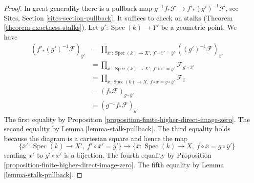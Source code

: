 \documentclass[10pt,a4paper]{amsart}
\theoremstyle{plain}
\theoremstyle{definition}
\theoremstyle{remark}
\numberwithin{equation}{subsection}
\def\Spec{\mathop{\mathrm{Spec}}}
\begin{document}
\begin{proof}
In great generality there is a pullback map
$g^{-1}f_*\mathcal{F} \to f'_*(g')^{-1}\mathcal{F}$, see
Sites, Section \ref{sites-section-pullback}.
It suffices to check on stalks (Theorem \ref{theorem-exactness-stalks}).
Let $\overline{y}' : \Spec(k) \to Y'$ be a geometric point.
We have
\begin{align*}
(f'_*(g')^{-1}\mathcal{F})_{\overline{y}'}
& =
\prod\nolimits_{\overline{x}' : \Spec(k) \to X',\ f' \circ \overline{x}' =
\overline{y}'}
((g')^{-1}\mathcal{F})_{\overline{x}'} \\
& =
\prod\nolimits_{\overline{x}' : \Spec(k) \to X',\ f' \circ \overline{x}' =
\overline{y}'} \mathcal{F}_{g' \circ \overline{x}'} \\
& =
\prod\nolimits_{\overline{x} : \Spec(k) \to X,\ f \circ \overline{x} =
g \circ \overline{y}'} \mathcal{F}_{\overline{x}} \\
& =
(f_*\mathcal{F})_{g \circ \overline{y}'} \\
& =
(g^{-1}f_*\mathcal{F})_{\overline{y}'}
\end{align*}
The first equality by
Proposition \ref{proposition-finite-higher-direct-image-zero}.
The second equality by
Lemma \ref{lemma-stalk-pullback}.
The third equality holds because the diagram is a cartesian square
and hence the map
$$
\{\overline{x}' : \Spec(k) \to X',\ f' \circ \overline{x}' =
\overline{y}'\}
\longrightarrow
\{\overline{x} : \Spec(k) \to X,\ f \circ \overline{x} =
g \circ \overline{y}'\}
$$
sending $\overline{x}'$ to $g' \circ \overline{x}'$ is a bijection.
The fourth equality by
Proposition \ref{proposition-finite-higher-direct-image-zero}.
The fifth equality by
Lemma \ref{lemma-stalk-pullback}.
\end{proof}
\end{document}
